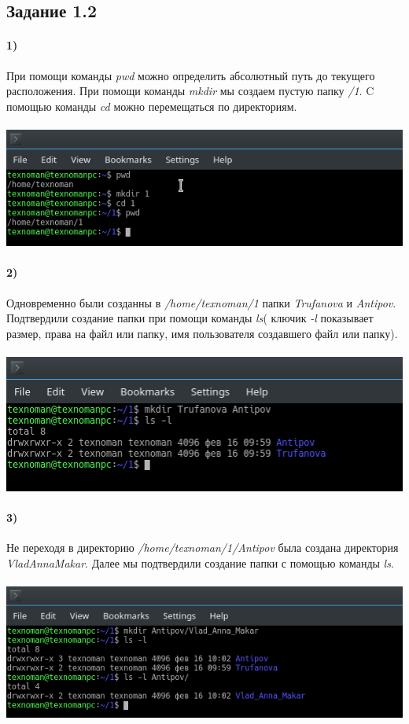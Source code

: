 \newpage
\subsection*{Задание 1.2}
	\paragraph{1)}
	При помощи команды \textit{pwd} можно определить абсолютный путь до текущего расположения. При помощи команды \textit{mkdir} мы создаем пустую папку \textit{/1}. C помощью команды \textit{cd} можно перемещаться по директориям.\\
	\\
	\includegraphics[width=\textwidth]{1.png}

	\paragraph{2)}
	Одновременно были созданны в \textit{/home/texnoman/1} папки \textit{Trufanova} и \textit{Antipov}. Подтвердили создание папки при помощи команды \textit{ls}( ключик \textit{-l} показывает размер, права на файл или папку, имя пользователя создавшего файл или папку).\\
	\\
	\includegraphics[width=\textwidth]{2.png}

	\paragraph{3)}
	Не переходя в директорию \textit{/home/texnoman/1/Antipov} была создана директория \textit{VladAnnaMakar}. Далее мы подтвердили создание папки с помощью команды \textit{ls}.\\
	\\
	\includegraphics[width=\textwidth ]{3.png}

